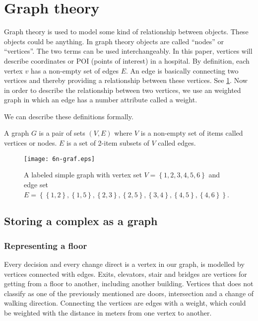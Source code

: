 \section{Graph theory}

Graph theory is used to model some kind of relationship between objects. These objects could be anything. In graph theory objects are called \enquote{nodes} or \enquote{vertices}. The two terms can be used interchangeably. In this paper, vertices will describe coordinates or POI (points of interest) in a hospital. By definition, each vertex $v$ has a non-empty set of edges $E$. An edge is basically connecting two vertices and thereby providing a relationship between these vertices. See \cref{fig:labeled_graph}. Now in order to describe the relationship between two vertices, we use an weighted graph in which an edge has a number attribute called a weight.\cite{wiki_graph_glos,MIT2012}

We can describe these definitions formally.\cite{MIT2012}
\begin{mydef}
	A graph $G$ is a pair of sets $(V,E)$ where $V$ is a non-empty set of items called vertices or nodes. $E$ is a set of 2-item subsets of $V$ called edges.
\end{mydef}

\begin{figure}[ht!]
    \centering
    \texttt{[image: 6n-graf.eps]}
    \caption{A labeled simple graph with vertex set $V = \left\{ {1, 2, 3, 4, 5, 6} \right\} $ and edge set $E = \left\{ \left\{ {1,2}\right\}, \left\{ {1,5}\right\}, \left\{ {2,3}\right\}, \left\{ {2,5}\right\}, \left\{ {3,4}\right\}, \left\{ {4,5} \right\} , \left\{ {4,6} \right\} \right\}$. \cite{wiki_graph_glos}}
    \label{fig:labeled_graph}
  \end{figure}

\subsection{Storing a complex as a graph}

\subsubsection{Representing a floor}

Every decision and every change direct is a vertex in our graph, is modelled by vertices connected with edges. Exits, elevators, stair and bridges are vertices for getting from a floor to another, including another building. Vertices that does not classify as one of the previously mentioned are doors, intersection and a change of walking direction. Connecting the vertices are edges with a weight, which could be weighted with the distance in meters from one vertex to another.

